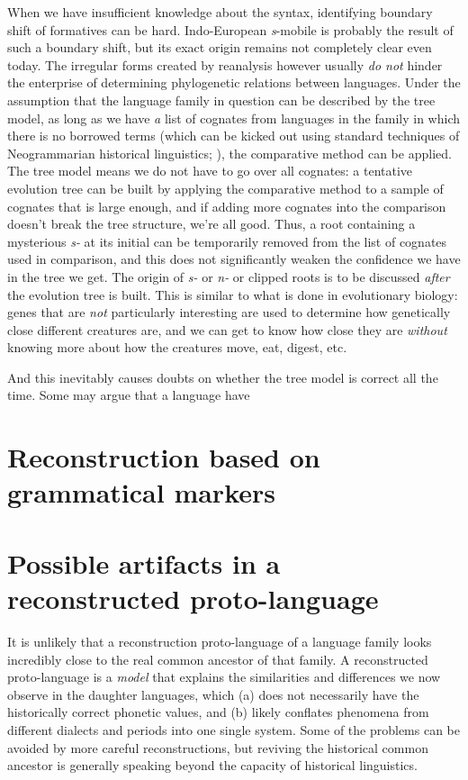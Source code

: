 \documentclass[a4paper, oneside, scheme=plain, 12pt]{article}
\newcommand*{\citepage}[1]{p.~{#1}}
\newcommand{\form}[1]{\emph{#1}}
\begin{document}
When we have insufficient knowledge about the syntax,
identifying boundary shift of formatives can be hard.
Indo-European \form{s}-mobile is probably the result of such a boundary shift,
but its exact origin remains not completely clear even today.
The irregular forms created by reanalysis however usually \emph{do not} hinder
the enterprise of determining phylogenetic relations between languages.
Under the assumption that the language family in question can be described by the tree model,
as long as we have \emph{a} list of cognates from languages in the family
in which there is no borrowed terms
(which can be kicked out using standard techniques of Neogrammarian historical linguistics;
\citealt[\citepage{3.5}]{campbell2013historical}),
the comparative method can be applied.
The tree model means we do not have to go over all cognates:
a tentative evolution tree can be built by
applying the comparative method to a sample of cognates that is large enough,
and if adding more cognates into the comparison doesn't break the tree structure, we're all good.
Thus, a root containing a mysterious \form{s-} at its initial can be 
temporarily removed from the list of cognates used in comparison,
and this does not significantly weaken the confidence we have in the tree we get.
The origin of \form{s-} or \form{n-} or clipped roots is to be discussed 
\emph{after} the evolution tree is built.
This is similar to what is done in evolutionary biology:
genes that are \emph{not} particularly interesting are used to determine how genetically close different creatures are,
and we can get to know how close they are \emph{without} knowing
more about how the creatures move, eat, digest, etc.

And this inevitably causes doubts on whether the tree model is correct all the time.
Some may argue that a language have 

\section{Reconstruction based on grammatical markers}

\section{Possible artifacts in a reconstructed proto-language}

It is unlikely that a reconstruction proto-language of a language family
looks incredibly close to the real common ancestor of that family.
A reconstructed proto-language is a \emph{model} that explains
the similarities and differences we now observe in the daughter languages,
which (a) does not necessarily have the historically correct phonetic values,
and (b) likely conflates phenomena from different dialects and periods into one single system.
Some of the problems can be avoided by more careful reconstructions,
but reviving the historical common ancestor is generally speaking beyond the capacity of historical linguistics.
\end{document}
